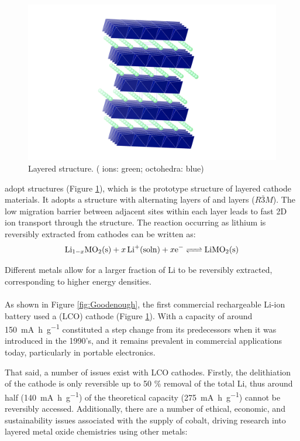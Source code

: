 \subsection{}
\begin{figure}
\centering
\includegraphics[width=0.4\linewidth]{figures/structures/LiCoO2}
\caption[Layered  structure]{Layered  structure. ( ions: green;  octohedra: blue)\\ }
\label{fig:LCO}
\end{figure}
 adopt  structures (Figure \ref{fig:LCO}), which is the prototype structure of  layered cathode materials.
It adopts a structure with alternating layers of \ce{[CoO2]-} and  layers ($R\bar{3}M$).\cite{Islam2014}
The low migration barrier between adjacent  sites within each layer leads to fast 2D ion transport through the structure.
The reaction occurring as lithium is reversibly extracted from  cathodes can be written as:\cite{Islam2014}
\begin{equation}
\ce{Li_{1-x}MO2(s) +$x$Li+(soln) +$x$e- <=> LiMO2(s)}
\end{equation}

Different metals allow for a larger fraction of Li to be reversibly extracted, corresponding to higher energy densities.

\paragraph{}
As shown in Figure \ref{fig:Goodenough}, the first commercial rechargeable Li-ion battery used a  (LCO) cathode (Figure \ref{fig:LCO}).
With a capacity of around {\color{red}\SI{150}{\milli\ampere\hour\per\gram}} constituted a step change from its predecessors when it was introduced in the 1990's, and it remains prevalent in commercial applications today, particularly in portable electronics.

That said, a number of issues exist with LCO cathodes.
Firstly, the delithiation of the cathode is only reversible up to 50 \% removal of the total Li, thus around half (\SI{140}{\milli\ampere\hour\per\gram}) of the theoretical capacity (\SI{275}{\milli\ampere\hour\per\gram}) cannot be reversibly accessed.
Additionally, there are a number of ethical, economic, and sustainability issues associated with the supply of cobalt,\cite{Mauger2017, Larcher2015} driving research into layered metal oxide chemistries using other metals:\cite{Rozier2015}

